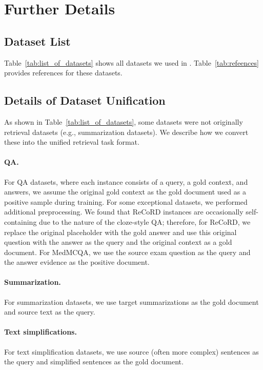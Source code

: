 \section{Further \rib Details }
\subsection{Dataset List}
Table~\ref{tab:list_of_datasets} shows all datasets we used in \rib. Table~\ref{tab:refeences} provides references for these datasets. 

\subsection{Details of Dataset Unification}
\label{sec:unification}
As shown in Table~\ref{tab:list_of_datasets}, some datasets were not originally retrieval datasets (e.g., summarization datasets). 
We describe how we convert these into the unified retrieval task format. 

\paragraph{QA.}
For QA datasets, where each instance consists of a query, a gold context, and answers, we assume the original gold context as the gold document used as a positive sample during training. 
For some exceptional datasets, we performed additional preprocessing. 
We found that ReCoRD instances are occasionally self-containing due to the nature of the cloze-style QA; therefore, for ReCoRD, we replace the original placeholder with the gold answer and use this original question with the answer as the query and the original context as a gold document. 
For MedMCQA, we use the source exam question as the query and the answer evidence as the positive document. 

\paragraph{Summarization.}
For summarization datasets, we use target summarizations as the gold document and source text as the query. 

\paragraph{Text simplifications.}
For text simplification datasets, we use source (often more complex) sentences as the query and simplified sentences as the gold document. 

